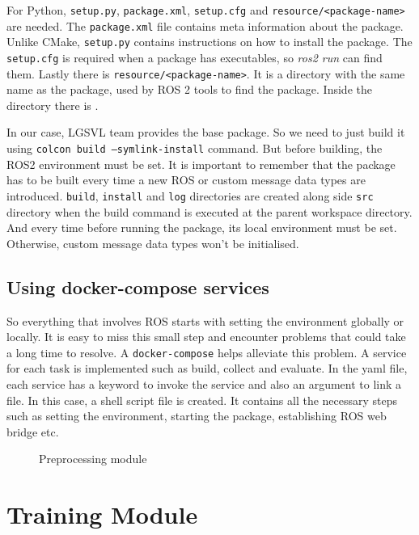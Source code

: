 For Python, \texttt{setup.py}, \texttt{package.xml}, \texttt{setup.cfg} and
\texttt{resource/<package-name>} are needed. The \texttt{package.xml} file contains meta
information about the package. Unlike CMake, \texttt{setup.py} contains instructions on
how to install the package. The \texttt{setup.cfg} is required when a package has
executables, so \textit{ros2 run} can find them. Lastly there is
\texttt{resource/<package-name>}. It is a directory with the same name as the package,
used by ROS 2 tools to find the package. Inside the directory there is \texttt{}.

In our case, LGSVL team provides the base package. So we need to just build it using
\texttt{colcon build --symlink-install} command. But before building, the ROS2 environment
 must be set. It is important to remember that the package has
to be built every time a new ROS or custom message data types are introduced. \texttt{build},
\texttt{install} and \texttt{log} directories are created along side \texttt{src}
directory when the build command is executed at the parent workspace directory. And
every time before running the package, its local environment must be set. Otherwise,
custom message data types won't be initialised.

\subsection{Using docker-compose services}
So everything that involves ROS starts with setting the environment globally or locally.
It is easy to miss this small step and encounter problems that could take a long time to
resolve. A \texttt{docker-compose} helps alleviate this problem. A service for each task
is implemented such as build, collect and evaluate. In the yaml file, each service has a
keyword to invoke the service and also an argument to link a file. In this case, a
shell script file is created. It contains all the necessary steps
such as setting the environment, starting the package, establishing ROS web bridge etc.
\fi

\begin{figure}
	\centering
    \def\svgwidth{0.6\textwidth}
    \caption{Preprocessing module}
    \label{fig:preprocessing}
\end{figure}

\section{Training Module}

